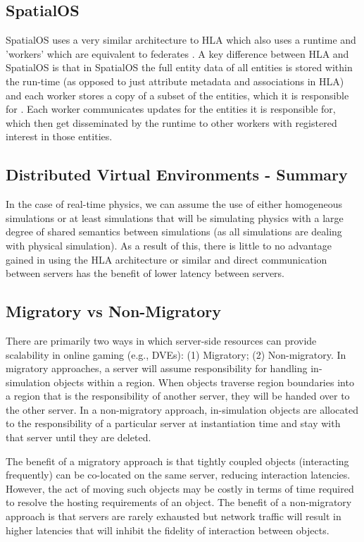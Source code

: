 \subsection{SpatialOS}
SpatialOS uses a very similar architecture to HLA which also uses a runtime and 'workers' which are equivalent to federates \cite{SpatialOS}. A key difference between HLA and SpatialOS is that in SpatialOS the full entity data of all entities is stored within the run-time (as opposed to just attribute metadata and associations in HLA) and each worker stores a copy of a subset of the entities, which it is responsible for \cite{Introduc36:online}. Each worker communicates updates for the entities it is responsible for, which then get disseminated by the runtime to other workers with registered interest in those entities.

\subsection{Distributed Virtual Environments - Summary}
In the case of real-time physics, we can assume the use of either homogeneous simulations or at least simulations that will be simulating physics with a large degree of shared semantics between simulations (as all simulations are dealing with physical simulation). As a result of this, there is little to no advantage gained in using the HLA architecture or similar and direct communication between servers has the benefit of lower latency between servers.

\subsection{Migratory vs Non-Migratory}
There are primarily two ways in which server-side resources can provide scalability in online gaming (e.g., DVEs): (1) Migratory; (2) Non-migratory. In migratory approaches, a server will assume responsibility for handling in-simulation objects within a region. When objects traverse region boundaries into a region that is the responsibility of another server, they will be handed over to the other server. In a non-migratory approach, in-simulation objects are allocated to the responsibility of a particular server at instantiation time and stay with that server until they are deleted.

The benefit of a migratory approach is that tightly coupled objects (interacting frequently) can be co-located on the same server, reducing interaction latencies. However, the act of moving such objects may be costly in terms of time required to resolve the hosting requirements of an object. The benefit of a non-migratory approach is that servers are rarely exhausted but network traffic will result in higher latencies that will inhibit the fidelity of interaction between objects.

